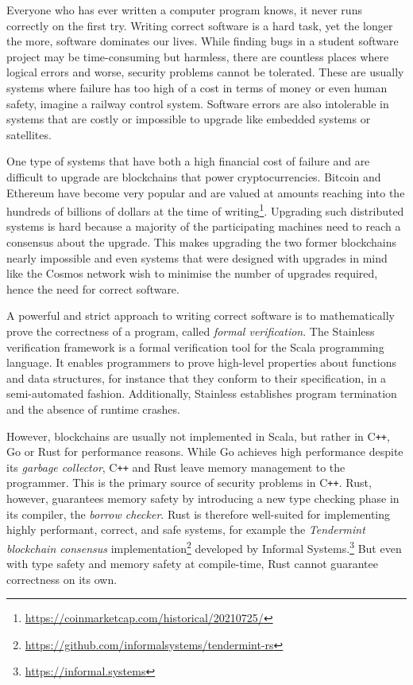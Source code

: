 Everyone who has ever written a computer program knows, it never runs correctly
on the first try. Writing correct software is a hard task, yet the longer the
more, software dominates our lives. While finding bugs in a student software
project may be time-consuming but harmless, there are countless places where
logical errors and worse, security problems cannot be tolerated. These are
usually systems where failure has too high of a cost in terms of money or even
human safety, imagine a railway control system. Software errors are also
intolerable in systems that are costly or impossible to upgrade like embedded
systems or satellites.

One type of systems that have both a high financial cost of failure and are
difficult to upgrade are blockchains that power cryptocurrencies. Bitcoin
\cite{bitcoin} and Ethereum \cite{ethereum} have become very popular and are
valued at amounts reaching into the hundreds of billions of dollars at the time
of writing\footnote{\url{https://coinmarketcap.com/historical/20210725/}}.
Upgrading such distributed systems is hard because a majority of the
participating machines need to reach a consensus about the upgrade. This makes
upgrading the two former blockchains nearly impossible and even systems that
were designed with upgrades in mind like the Cosmos network \cite{cosmos} wish
to minimise the number of upgrades required, hence the need for correct
software.

A powerful and strict approach to writing correct software is to mathematically
prove the correctness of a program, called \emph{formal verification}. The
Stainless verification framework \cite{stainless} is a formal verification tool
for the Scala programming language. It enables programmers to prove high-level
properties about functions and data structures, for instance that they conform
to their specification, in a semi-automated fashion. Additionally, Stainless
establishes program termination and the absence of runtime crashes.

However, blockchains are usually not implemented in Scala, but rather in
C\texttt{++}, Go or Rust for performance reasons. While Go achieves high
performance despite its \emph{garbage collector}, C\texttt{++} and Rust leave
memory management to the programmer. This is the primary source of security
problems in C\texttt{++}. Rust, however, guarantees memory safety by introducing a
new type checking phase in its compiler, the \emph{borrow checker}. Rust is
therefore well-suited for implementing highly performant, correct, and safe
systems, for example the \emph{Tendermint blockchain consensus}
implementation\footnote{\url{https://github.com/informalsystems/tendermint-rs}}
developed by Informal Systems.\footnote{\url{https://informal.systems}} But even
with type safety and memory safety at compile-time, Rust cannot guarantee
correctness on its own.

